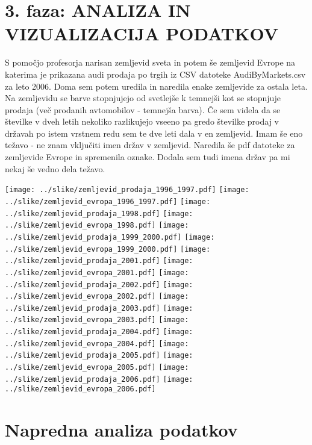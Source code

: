 \documentclass[11pt,a4paper]{article}
\begin{document}
\section{3. faza: ANALIZA IN VIZUALIZACIJA PODATKOV}
S pomočjo profesorja narisan zemljevid sveta in potem še zemljevid Evrope na katerima je prikazana audi prodaja po trgih iz CSV datoteke AudiByMarkets.csv za leto 2006. Doma sem potem uredila in naredila enake zemljevide za ostala leta. Na zemljevidu se barve stopnjujejo od svetlejše k temnejši kot se stopnjuje prodaja (več prodanih avtomobilov - temnejša barva). Če sem videla da se številke v dveh letih nekoliko razlikujejo vseeno pa gredo številke prodaj v državah po istem vrstnem redu sem te dve leti dala v en zemljevid. Imam še eno težavo - ne znam vključiti imen držav v zemljevid.
Naredila še pdf datoteke za zemljevide Evrope in spremenila oznake. Dodala sem tudi imena držav pa mi nekaj še vedno dela težavo.

\texttt{[image: ../slike/zemljevid\_prodaja\_1996\_1997.pdf]}
\texttt{[image: ../slike/zemljevid\_evropa\_1996\_1997.pdf]}
\texttt{[image: ../slike/zemljevid\_prodaja\_1998.pdf]}
\texttt{[image: ../slike/zemljevid\_evropa\_1998.pdf]}
\texttt{[image: ../slike/zemljevid\_prodaja\_1999\_2000.pdf]}
\texttt{[image: ../slike/zemljevid\_evropa\_1999\_2000.pdf]}
\texttt{[image: ../slike/zemljevid\_prodaja\_2001.pdf]}
\texttt{[image: ../slike/zemljevid\_evropa\_2001.pdf]}
\texttt{[image: ../slike/zemljevid\_prodaja\_2002.pdf]}
\texttt{[image: ../slike/zemljevid\_evropa\_2002.pdf]}
\texttt{[image: ../slike/zemljevid\_prodaja\_2003.pdf]}
\texttt{[image: ../slike/zemljevid\_evropa\_2003.pdf]}
\texttt{[image: ../slike/zemljevid\_prodaja\_2004.pdf]}
\texttt{[image: ../slike/zemljevid\_evropa\_2004.pdf]}
\texttt{[image: ../slike/zemljevid\_prodaja\_2005.pdf]}
\texttt{[image: ../slike/zemljevid\_evropa\_2005.pdf]}
\texttt{[image: ../slike/zemljevid\_prodaja\_2006.pdf]}
\texttt{[image: ../slike/zemljevid\_evropa\_2006.pdf]}

\section{Napredna analiza podatkov}

\end{document}
